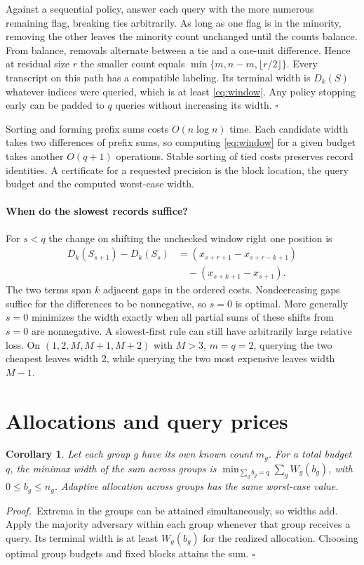 \documentclass[final,5p,times,twocolumn]{elsarticle}
\newtheorem{corollary}[theorem]{Corollary}
\newcommand{\proofstart}{\noindent\textit{Proof.}\ }
\newcommand{\proofend}{\hfill$\square$\par}
\begin{document}
Against a sequential policy, answer each query with the more numerous remaining flag, breaking ties arbitrarily. As long as one flag is in the minority, removing the other leaves the minority count unchanged until the counts balance. From balance, removals alternate between a tie and a one-unit difference. Hence at residual size $r$ the smaller count equals $\min\{m,n-m,\lfloor r/2\rfloor\}$. Every transcript on this path has a compatible labeling. Its terminal width is $D_k(S)$ whatever indices were queried, which is at least \eqref{eq:window}. Any policy stopping early can be padded to $q$ queries without increasing its width. \proofend

Sorting and forming prefix sums costs $O(n\log n)$ time. Each candidate width takes two differences of prefix sums, so computing \eqref{eq:window} for a given budget takes another $O(q+1)$ operations. Stable sorting of tied costs preserves record identities. A certificate for a requested precision is the block location, the query budget and the computed worst-case width.

\paragraph{When do the slowest records suffice?}
For $s<q$ the change on shifting the unchecked window right one position is
\begin{align*}
D_k(S_{s+1})-D_k(S_s)
 &= (x_{s+r+1}-x_{s+r-k+1})\\
 &\quad -(x_{s+k+1}-x_{s+1}).
\end{align*}
The two terms span $k$ adjacent gaps in the ordered costs. Nondecreasing gaps suffice for the differences to be nonnegative, so $s=0$ is optimal. More generally $s=0$ minimizes the width exactly when all partial sums of these shifts from $s=0$ are nonnegative. A slowest-first rule can still have arbitrarily large relative loss. On $(1,2,M,M+1,M+2)$ with $M>3$, $m=q=2$, querying the two cheapest leaves width 2, while querying the two most expensive leaves width $M-1$.

\section{Allocations and query prices}
\begin{corollary}\label{co:groups}
Let each group $g$ have its own known count $m_g$. For a total budget $q$, the minimax width of the sum across groups is $\min_{\sum_g b_g=q}\sum_g W_g(b_g)$, with $0\leq b_g\leq n_g$. Adaptive allocation across groups has the same worst-case value.
\end{corollary}
\proofstart Extrema in the groups can be attained simultaneously, so widths add. Apply the majority adversary within each group whenever that group receives a query. Its terminal width is at least $W_g(b_g)$ for the realized allocation. Choosing optimal group budgets and fixed blocks attains the sum. \proofend
\end{document}
